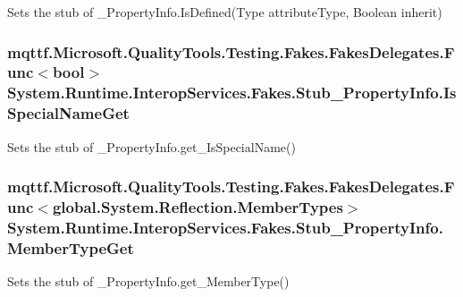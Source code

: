Sets the stub of \-\_\-\-Property\-Info.\-Is\-Defined(\-Type attribute\-Type, Boolean inherit)

\hypertarget{class_system_1_1_runtime_1_1_interop_services_1_1_fakes_1_1_stub___property_info_afc59c4ab00d2aca1b7b4e451128511df}{
\subsubsection[{Is\-Special\-Name\-Get}]{\setlength{\rightskip}{0pt plus 5cm}mqttf.\-Microsoft.\-Quality\-Tools.\-Testing.\-Fakes.\-Fakes\-Delegates.\-Func$<$bool$>$ System.\-Runtime.\-Interop\-Services.\-Fakes.\-Stub\-\_\-\-Property\-Info.\-Is\-Special\-Name\-Get}}\label{class_system_1_1_runtime_1_1_interop_services_1_1_fakes_1_1_stub___property_info_afc59c4ab00d2aca1b7b4e451128511df}


Sets the stub of \-\_\-\-Property\-Info.\-get\-\_\-\-Is\-Special\-Name()

\hypertarget{class_system_1_1_runtime_1_1_interop_services_1_1_fakes_1_1_stub___property_info_a4faab89c04f7198f8f08ddb1c4288158}{
\subsubsection[{Member\-Type\-Get}]{\setlength{\rightskip}{0pt plus 5cm}mqttf.\-Microsoft.\-Quality\-Tools.\-Testing.\-Fakes.\-Fakes\-Delegates.\-Func$<$global.\-System.\-Reflection.\-Member\-Types$>$ System.\-Runtime.\-Interop\-Services.\-Fakes.\-Stub\-\_\-\-Property\-Info.\-Member\-Type\-Get}}\label{class_system_1_1_runtime_1_1_interop_services_1_1_fakes_1_1_stub___property_info_a4faab89c04f7198f8f08ddb1c4288158}


Sets the stub of \-\_\-\-Property\-Info.\-get\-\_\-\-Member\-Type()

